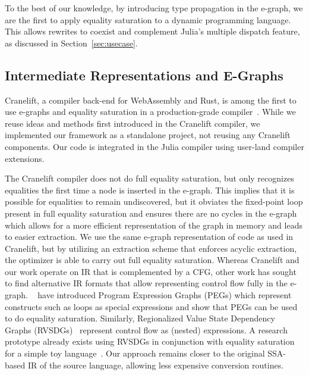 To the best of our knowledge, by introducing type propagation in the e-graph, we are the first to apply equality saturation to a dynamic programming language.
This allows rewrites to coexist and complement Julia's multiple dispatch feature, as discussed in Section~\ref{sec:usecase}.

\subsection{Intermediate Representations and E-Graphs}
Cranelift, a compiler back-end for WebAssembly and Rust, is among the first to use e-graphs and equality saturation in a production-grade compiler~\cite{fallinAegraphsAcyclicEgraphs2023}. While we reuse ideas and methods first introduced in the Cranelift compiler, we implemented our framework as a standalone project, not reusing any Cranelift components. Our code is integrated in the Julia compiler using user-land compiler extensions.

The Cranelift compiler does not do full equality saturation, but only recognizes equalities the first time a node is inserted in the e-graph.
This implies that it is possible for equalities to remain undiscovered, but it obviates the fixed-point loop present in full equality saturation and ensures there are no cycles in the e-graph which allows for a more efficient representation of the graph in memory and leads to easier extraction.
We use the same e-graph representation of code as used in Cranelift, but by utilizing an extraction scheme that enforces acyclic extraction, the optimizer is able to carry out full equality saturation.
Whereas Cranelift and our work operate on IR that is complemented by a CFG, other work has sought to find alternative IR formats that allow representing control flow fully in the e-graph.
\citeauthor{tateEqualitySaturationNew2009}~\cite{tateEqualitySaturationNew2009} have introduced Program Expression Graphs (PEGs) which represent constructs such as loops as special expressions and show that PEGs can be used to do equality saturation.
Similarly, Regionalized Value State Dependency Graphs (RVSDGs)~\cite{bahmannPerfectReconstructabilityControl2015,reissmannRVSDGIntermediateRepresentation2020} represent control flow as (nested) expressions.
A research prototype already exists using RVSDGs in conjunction with equality saturation for a simple toy language~\cite{optir2022}.
Our approach remains closer to the original SSA-based IR of the source language, allowing less expensive conversion routines.

